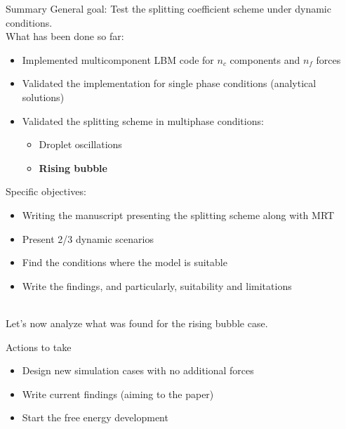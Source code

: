 \documentclass[8pt]{beamer}
\begin{document}
	\begin{frame}{Summary}
		General goal: Test the splitting coefficient scheme under dynamic conditions. \\
		
		What has been done so far:
		
		\begin{itemize}
			\item Implemented multicomponent LBM code for $n_c$ components and $n_f$ forces 
			\item Validated the implementation for single phase conditions (analytical solutions)
			\item Validated the splitting scheme in multiphase conditions: 
			\begin{itemize}
				\item Droplet oscillations
				\item \textbf{Rising bubble}
			\end{itemize}
		\end{itemize}
		
		Specific objectives:
		\begin{itemize}
			\item Writing the manuscript presenting the splitting scheme along with MRT 
			\item Present 2/3 dynamic scenarios 
			\item Find the conditions where the model is suitable
			\item Write the findings, and particularly, suitability and limitations
		\end{itemize}
		
		~\\
		Let's now analyze what was found for the rising bubble case.
	\end{frame}
	
	\begin{frame}{Actions to take}
		\begin{itemize}
			\item Design new simulation cases with no additional forces
			\item Write current findings (aiming to the paper)
			\item Start the free energy development
		\end{itemize}
	\end{frame}
	
	
\end{document}
